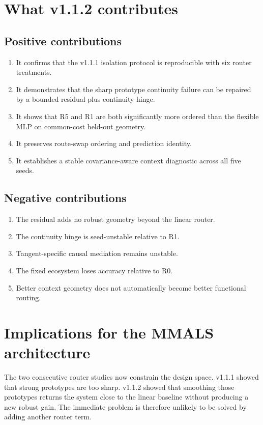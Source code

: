 \documentclass[11pt,a4paper]{article}
\begin{document}
\section{What v1.1.2 contributes}
\subsection{Positive contributions}
\begin{enumerate}
\item It confirms that the v1.1.1 isolation protocol is reproducible with six router treatments.
\item It demonstrates that the sharp prototype continuity failure can be repaired by a bounded residual plus continuity hinge.
\item It shows that R5 and R1 are both significantly more ordered than the flexible MLP on common-cost held-out geometry.
\item It preserves route-swap ordering and prediction identity.
\item It establishes a stable covariance-aware context diagnostic across all five seeds.
\end{enumerate}

\subsection{Negative contributions}
\begin{enumerate}
\item The residual adds no robust geometry beyond the linear router.
\item The continuity hinge is seed-unstable relative to R1.
\item Tangent-specific causal mediation remains unstable.
\item The fixed ecosystem loses accuracy relative to R0.
\item Better context geometry does not automatically become better functional routing.
\end{enumerate}

\section{Implications for the MMALS architecture}
The two consecutive router studies now constrain the design space. v1.1.1 showed that strong prototypes are too sharp. v1.1.2 showed that smoothing those prototypes returns the system close to the linear baseline without producing a new robust gain. The immediate problem is therefore unlikely to be solved by adding another router term.
\end{document}
